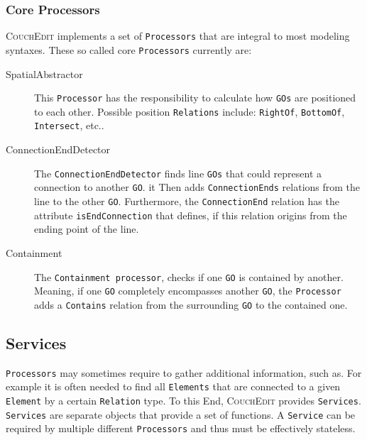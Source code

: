 \subsubsection{Core Processors}
\label{sec:core-processors}
\textsc{CouchEdit} implements a set of \texttt{Processors} that are integral to most modeling syntaxes. These so called core \texttt{Processors} currently are: 
\begin{description}
  \item[SpatialAbstractor] This \texttt{Processor} has the responsibility to calculate how \texttt{GOs} are positioned to each other. Possible position \texttt{Relations} include: \texttt{RightOf}, \texttt{BottomOf}, \texttt{Intersect}, etc..
  \item[ConnectionEndDetector] The \texttt{ConnectionEndDetector} finds line \texttt{GOs} that could represent a connection to another \texttt{GO}. it Then adds \texttt{ConnectionEnds} relations from the line to the other \texttt{GO}. Furthermore, the \texttt{ConnectionEnd} relation has the attribute \texttt{isEndConnection} that defines, if this relation origins from the ending point of the line.
  \item[Containment] The \texttt{Containment processor}, checks if one \texttt{GO} is contained by another. Meaning, if one \texttt{GO} completely encompasses another \texttt{GO}, the \texttt{Processor} adds a \texttt{Contains} relation from the surrounding \texttt{GO} to the contained one.
\end{description}

\subsection{Services}
\label{sec:services}
\texttt{Processors} may sometimes require to gather additional information, such as. For example it is often needed to find all \texttt{Elements} that are connected to a given \texttt{Element} by a certain \texttt{Relation} type.
To this End, \textsc{CouchEdit} provides \texttt{Services}. \texttt{Services} are separate objects that provide a set of functions. A \texttt{Service} can be required by multiple different \texttt{Processors} and thus must be effectively stateless.




